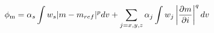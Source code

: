 \begin{equation}
\phi_{\rm m} =
    {\alpha_s}\int w_s
    |m-m_{ref}|^p dv
     +
    \sum_{j=x,y,z}{\alpha_j}\int w_j
    \left|\frac{\partial m}{\partial i}\right|^q dv
\label{eq:model_regularization}
\end{equation}

